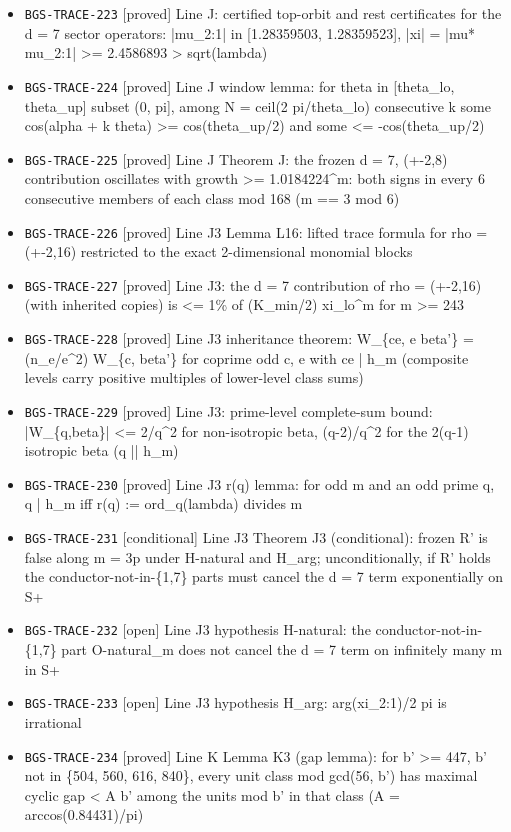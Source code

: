 \begin{itemize}
  \item \texttt{BGS-TRACE-223} [proved] Line J: certified top-orbit and rest certificates for the d = 7 sector operators: |mu\_2:1| in [1.28359503, 1.28359523], |xi| = |mu* mu\_2:1| >= 2.4586893 > sqrt(lambda)
  \item \texttt{BGS-TRACE-224} [proved] Line J window lemma: for theta in [theta\_lo, theta\_up] subset (0, pi], among N = ceil(2 pi/theta\_lo) consecutive k some cos(alpha + k theta) >= cos(theta\_up/2) and some <= -cos(theta\_up/2)
  \item \texttt{BGS-TRACE-225} [proved] Line J Theorem J: the frozen d = 7, (+-2,8) contribution oscillates with growth >= 1.0184224\textasciicircum{}m: both signs in every 6 consecutive members of each class mod 168 (m == 3 mod 6)
  \item \texttt{BGS-TRACE-226} [proved] Line J3 Lemma L16: lifted trace formula for rho = (+-2,16) restricted to the exact 2-dimensional monomial blocks
  \item \texttt{BGS-TRACE-227} [proved] Line J3: the d = 7 contribution of rho = (+-2,16) (with inherited copies) is <= 1\% of (K\_min/2) xi\_lo\textasciicircum{}m for m >= 243
  \item \texttt{BGS-TRACE-228} [proved] Line J3 inheritance theorem: W\_\{ce, e beta'\} = (n\_e/e\textasciicircum{}2) W\_\{c, beta'\} for coprime odd c, e with ce | h\_m (composite levels carry positive multiples of lower-level class sums)
  \item \texttt{BGS-TRACE-229} [proved] Line J3: prime-level complete-sum bound: |W\_\{q,beta\}| <= 2/q\textasciicircum{}2 for non-isotropic beta, (q-2)/q\textasciicircum{}2 for the 2(q-1) isotropic beta (q || h\_m)
  \item \texttt{BGS-TRACE-230} [proved] Line J3 r(q) lemma: for odd m and an odd prime q, q | h\_m iff r(q) := ord\_q(lambda) divides m
  \item \texttt{BGS-TRACE-231} [conditional] Line J3 Theorem J3 (conditional): frozen R' is false along m = 3p under H-natural and H\_arg; unconditionally, if R' holds the conductor-not-in-\{1,7\} parts must cancel the d = 7 term exponentially on S+
  \item \texttt{BGS-TRACE-232} [open] Line J3 hypothesis H-natural: the conductor-not-in-\{1,7\} part O-natural\_m does not cancel the d = 7 term on infinitely many m in S+
  \item \texttt{BGS-TRACE-233} [open] Line J3 hypothesis H\_arg: arg(xi\_2:1)/2 pi is irrational
  \item \texttt{BGS-TRACE-234} [proved] Line K Lemma K3 (gap lemma): for b' >= 447, b' not in \{504, 560, 616, 840\}, every unit class mod gcd(56, b') has maximal cyclic gap < A b' among the units mod b' in that class (A = arccos(0.84431)/pi)

\end{itemize}
